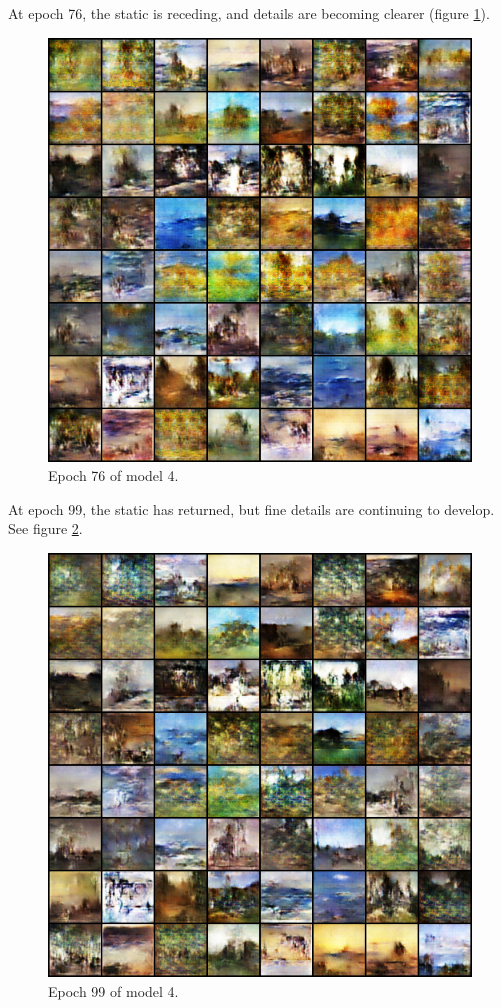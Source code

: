 \documentclass[11pt,letterpaper]{article}
\begin{document}
				At epoch 76, the static is receding, and details are becoming clearer (figure \ref{fig:wa64:epoch076generator}).
				\begin{figure}
					\centering
					\includegraphics[width=1.0\linewidth]{results/model4/epoch076_generator}
					\caption{Epoch 76 of model 4.}
					\label{fig:wa64:epoch076generator}
				\end{figure}

				At epoch 99, the static has returned, but fine details are continuing to develop.
				See figure \ref{fig:wa64:epoch099generator}.
				\begin{figure}
					\centering
					\includegraphics[width=1.0\linewidth]{results/model4/epoch099_generator}
					\caption{Epoch 99 of model 4.}
					\label{fig:wa64:epoch099generator}
				\end{figure}
\end{document}
